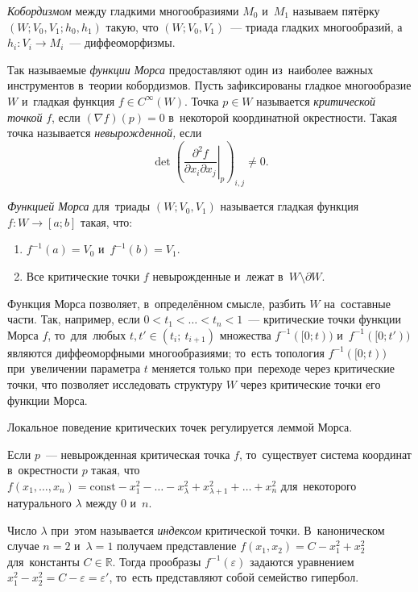 \documentclass[a4paper,oneside]{article}
\newcommand{\notewrap}[1]{(#1)}
\begin{document}
\textit{Кобордизмом} между гладкими многообразиями $M_0$ и~$M_1$ называем пятёрку
$(W;\allowbreak V_0,\allowbreak V_1;\allowbreak h_0,\allowbreak h_1)$ такую,
что $(W; V_0, V_1)$~— триада гладких многообразий, а~$h_i : V_i \rightarrow M_i$~— диффеоморфизмы.

Так называемые \textit{функции Морса} предоставляют один из~наиболее важных инструментов в~теории
кобордизмов. Пусть зафиксированы гладкое многообразие $W$ и~гладкая функция $f \in C^{\infty}(W)$.
Точка $p \in W$ называется \textit{критической точкой} $f$, если $(\nabla f)(p) = 0$ в~некоторой
координатной окрестности. Такая точка называется \textit{невырожденной,} если
\[
  \det\left(\left.\frac{\partial^2 f}{\partial x_i \partial x_j}\right|_{p}\right)_{i,j} \neq 0.
\]

\textit{Функцией Морса} для~триады $(W; V_0, V_1)$ называется гладкая функция $f : W \rightarrow [a; b]$
такая, что:
\begin{enumerate}
  \item $f^{-1}(a) = V_0$ и~$f^{-1}(b) = V_1$.
  \item Все критические точки $f$ невырожденные и~лежат в~$W \setminus \partial W$.
\end{enumerate}
Функция Морса позволяет, в~определённом смысле, разбить $W$ на~составные части. Так, например,
если $0 < t_1 < \ldots < t_n < 1$~— критические точки функции Морса $f$,
то~для~любых $t, t' \in (t_i;\ t_{i + 1})$ множества $f^{-1}([0; t))$ и~$f^{-1}([0; t'))$
являются диффеоморфными многообразиями; то~есть топология $f^{-1}([0; t))$ при~увеличении
параметра $t$ меняется только при~переходе через критические точки, что позволяет исследовать
структуру $W$ через критические точки его функции Морса.

Локальное поведение критических точек регулируется леммой Морса.
\begin{lemma*}[\notewrap{Морса}]
  Если $p$~— невырожденная критическая точка $f$, то~существует система координат
  в~окрестности $p$ такая, что $f(x_1, \ldots, x_n) = \mathrm{const} - x_1^2 - \ldots - x_\lambda^2 +
  x_{\lambda + 1}^2 + \ldots + x_n^2$ для~некоторого натурального $\lambda$ между $0$ и~$n$.
\end{lemma*}

Число $\lambda$ при~этом называется \textit{индексом} критической точки. В~каноническом случае $n = 2$
и~$\lambda = 1$ получаем представление $f(x_1, x_2) = C - x_1^2 + x_2^2$ для~константы $C \in \mathbb{R}$.
Тогда прообразы $f^{-1}(\varepsilon)$ задаются уравнением $x_1^2 - x_2^2 = C - \varepsilon = \varepsilon'$,
то~есть представляют собой семейство гипербол.
\end{document}
